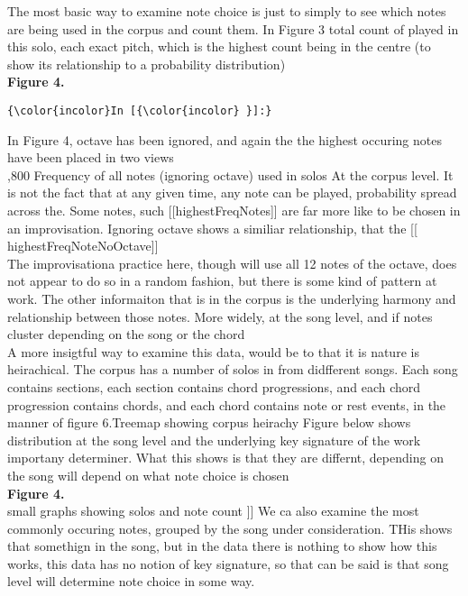 \documentclass[11pt]{article}
\begin{document}
\noindent
The most basic way to examine note choice is just to simply to see which notes are being used in the corpus and count them. In Figure 3 total count of played in this solo, each exact pitch, which is the highest count being in the centre (to show its relationship to a probability distribution)
\\

\noindent
\textbf{Figure 4.}
\\
    \begin{Verbatim}[commandchars=\\\{\}]
{\color{incolor}In [{\color{incolor} }]:} 
\end{Verbatim}
\noindent
In Figure 4, octave has been ignored, and again the the highest occuring notes have been placed in two views
\\\vspace{5mm} 
,800 Frequency of all notes (ignoring octave) used in solos At the corpus level. It is not the fact that at any given time, any note can be played, probability spread across the. Some notes, such [[highestFreqNotes]] are far more like to be chosen in an improvisation. Ignoring octave shows a similiar relationship, that the [[ highestFreqNoteNoOctave]]
\\

\noindent
The improvisationa practice here, though will use all 12 notes of the octave, does not appear to do so in a random fashion, but there is some kind of pattern at work. The other informaiton that is in the corpus is the underlying harmony and relationship between those notes. More widely, at the song level, and if notes cluster depending on the song or the chord
\\

\noindent
A more insigtful way to examine this data, would be to that it is nature is heirachical. The corpus has a number of solos in from didfferent songs. Each song contains sections, each section contains chord progressions, and each chord progression contains chords, and each chord contains note or rest events, in the manner of figure 6.Treemap showing corpus heirachy Figure below shows distribution at the song level and the underlying key signature of the work importany determiner. What this shows is that they are differnt, depending on the song will depend on what note choice is chosen
\\

\noindent
\textbf{Figure 4.}
\\\vspace{5mm} 
 small graphs showing solos and note count ]] We ca also examine the most commonly occuring notes, grouped by the song under consideration. THis shows that somethign in the song, but in the data there is nothing to show how this works, this data has no notion of key signature, so that can be said is that song level will determine note choice in some way.
\\
\end{document}
